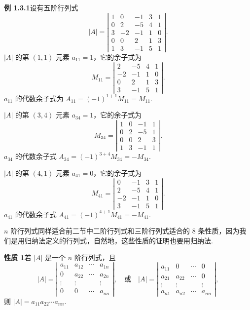 \documentclass[UTF8,12pt,a4paper,fontset=fandol]{ctexart}
\begin{document}
\noindent\textbf{例 1.3.1}\quad 设有五阶行列式
\[
|A|=
\left|\begin{array}{ccccc}
1 & 0 & -1 & 3 & 1\\
0 & 2 & -5 & 4 & 1\\
3 & -2 & -1 & 1 & 0\\
0 & 0 & 2 & 1 & 3\\
1 & 3 & -1 & 5 & 1
\end{array}\right|.
\]
$|A|$ 的第 $(1,1)$ 元素 $a_{11}=1$，它的余子式为
\[
M_{11}=
\left|\begin{array}{cccc}
2 & -5 & 4 & 1\\
-2 & -1 & 1 & 0\\
0 & 2 & 1 & 3\\
3 & -1 & 5 & 1
\end{array}\right|.
\]
$a_{11}$ 的代数余子式为 $A_{11}=(-1)^{1+1}M_{11}=M_{11}$.

$|A|$ 的第 $(3,4)$ 元素 $a_{34}=1$，它的余子式为
\[
M_{34}=
\left|\begin{array}{cccc}
1 & 0 & -1 & 1\\
0 & 2 & -5 & 1\\
0 & 0 & 2 & 3\\
1 & 3 & -1 & 1
\end{array}\right|.
\]
$a_{34}$ 的代数余子式 $A_{34}=(-1)^{3+4}M_{34}=-M_{34}$.

$|A|$ 的第 $(4,1)$ 元素 $a_{41}=0$，它的余子式为
\[
M_{41}=
\left|\begin{array}{cccc}
0 & -1 & 3 & 1\\
2 & -5 & 4 & 1\\
-2 & -1 & 1 & 0\\
3 & -1 & 5 & 1
\end{array}\right|.
\]
$a_{41}$ 的代数余子式 $A_{41}=(-1)^{4+1}M_{41}=-M_{41}$.

$n$ 阶行列式同样适合前二节中二阶行列式和三阶行列式适合的 8 条性质，因为我们是用归纳法定义的行列式，自然地，这些性质的证明也要用归纳法.

\noindent\textbf{性质 1}\quad 若 $|A|$ 是一个 $n$ 阶行列式，且
\[
|A|=
\left|\begin{array}{cccc}
a_{11} & a_{12} & \cdots & a_{1n}\\
0 & a_{22} & \cdots & a_{2n}\\
\vdots & \vdots & & \vdots\\
0 & 0 & \cdots & a_{nn}
\end{array}\right|,
\quad\text{或}\quad
|A|=
\left|\begin{array}{cccc}
a_{11} & 0 & \cdots & 0\\
a_{21} & a_{22} & \cdots & 0\\
\vdots & \vdots & & \vdots\\
a_{n1} & a_{n2} & \cdots & a_{nn}
\end{array}\right|,
\]
则 $|A|=a_{11}a_{22}\cdots a_{nn}$.
\end{document}
